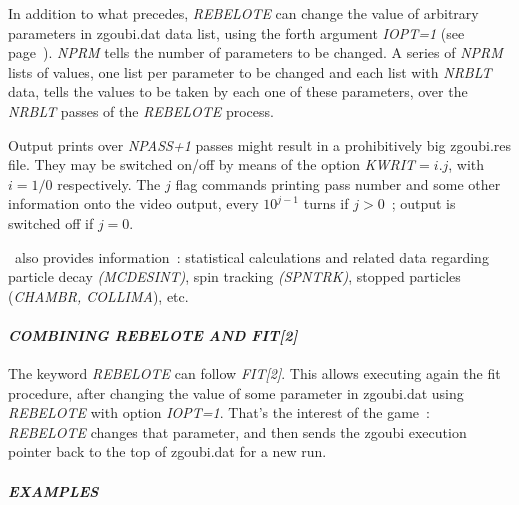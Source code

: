 \bigskip

\noindent In addition to what precedes,  \textsl{REBELOTE} can change the value of arbitrary parameters in zgoubi.dat 
data list, using the forth argument \textsl{IOPT=1} (see page~\pageref{REBEL_IOPT}). 
\textsl{NPRM} tells the number of parameters to be changed. 
A series of   \textsl{NPRM} lists of values, one list per parameter to be changed and each list 
with \textsl{NRBLT} data, tells the 
 values to be taken by each one of these parameters, over the \textsl{NRBLT} passes of the 
\textsl{REBELOTE} process.  

\bigskip

\noindent Output prints over \textsl{NPASS+1} passes  might result in a
prohibitively big zgoubi.res file. They may be switched on/off  by means of the option 
\mbox{\textsl{KWRIT}$= i.j$}, with $i=1/0$ respectively. The $j$ flag commands printing 
pass number and some other information onto the video output, every $10^{j-1}$ turns if $j>0$~; output is switched  
off if $j=0$. 

  
\bigskip

\noindent\REBELOTE\ also provides information~: statistical calculations and related 
data regarding particle decay \textsl{(MCDESINT)}, spin tracking  
\textsl{(SPNTRK)}, stopped particles (\textsl{CHAMBR,
 COLLIMA}), etc.  




\clearpage

\paragraph{\textit{COMBINING REBELOTE AND FIT[2]} }    %


\noindent The keyword  \textsl{REBELOTE}  can follow   \textsl{FIT[2]}.  This allows executing again 
the fit procedure,  after changing the value of some parameter in zgoubi.dat using \textsl{REBELOTE} with 
option \textsl{IOPT=1}. 
That's the interest of the game~: \textsl{REBELOTE}  changes that parameter, and then sends the 
zgoubi execution pointer back to the top of zgoubi.dat for a new run. 


\bigskip

\paragraph{\textit{EXAMPLES}} 

